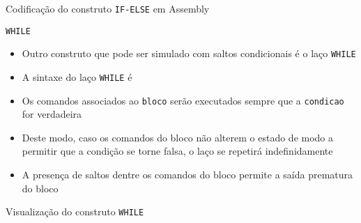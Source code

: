 \begin{frame}[fragile]{Codificação do construto {\tt IF-ELSE} em Assembly}
\end{frame}

\begin{frame}[fragile]{\tt WHILE}

    \begin{itemize}
        \item Outro construto que pode ser simulado com saltos condicionais é o laço \texttt{WHILE}

        \item A sintaxe do laço \texttt{WHILE} é


        \item Os comandos associados ao \texttt{bloco} serão executados sempre que a 
            \texttt{condicao} for verdadeira

        \item Deste modo, caso os comandos do bloco não alterem o estado de modo a permitir que 
            a condição se torne falsa, o laço se repetirá indefinidamente

        \item A presença de saltos dentre os comandos do bloco permite a saída prematura do bloco
    \end{itemize}

\end{frame}

\begin{frame}[fragile]{Visualização do construto {\tt WHILE}}
    \begin{figure}[ht]
        \centering
    \end{figure}
\end{frame}


